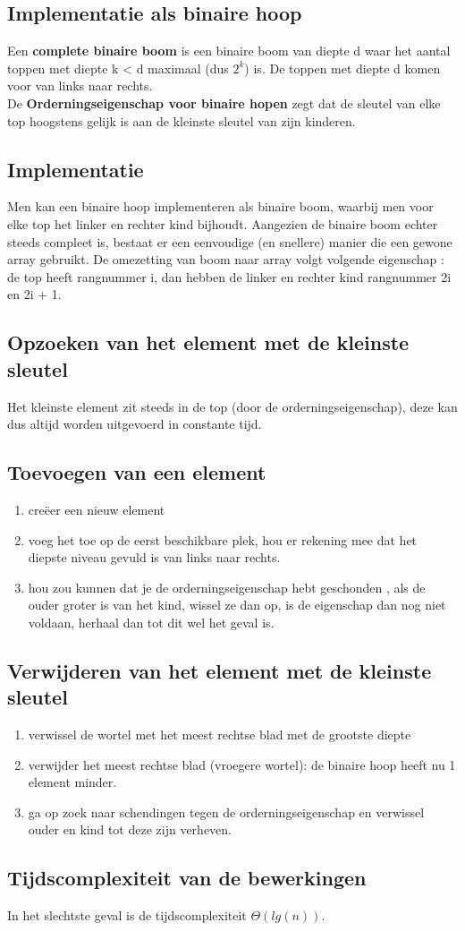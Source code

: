 \documentclass{report}
\begin{document}
  			\subsection{Implementatie als binaire hoop}
  				Een \textbf{complete binaire boom} is een binaire boom van diepte d waar het aantal toppen met diepte k < d maximaal (dus \(2^k\)) is. De toppen met diepte d komen voor van links naar rechts. 
  				\\ 
  				De \textbf{Orderningseigenschap voor binaire hopen} zegt dat de sleutel van elke top hoogstens gelijk is aan de kleinste sleutel van zijn kinderen. 
  			\subsection{Implementatie}
  				Men kan een binaire hoop implementeren als binaire boom, waarbij men voor elke top het linker en rechter kind bijhoudt. Aangezien de binaire boom echter steeds compleet is, bestaat er een eenvoudige (en snellere) manier die een gewone array gebruikt. De omezetting van boom naar array volgt volgende eigenschap : de top heeft rangnummer i, dan hebben de linker en rechter kind rangnummer 2i en 2i + 1.
  			\subsection{Opzoeken van het element met de kleinste sleutel}
  				Het kleinste element zit steeds in de top (door de orderningseigenschap), deze kan dus altijd worden uitgevoerd in constante tijd.
  			\subsection{Toevoegen van een element}
  				\begin{enumerate}
  					\item creëer een nieuw element
  					\item voeg het toe op de eerst beschikbare plek, hou er rekening mee dat het diepste niveau gevuld is van links naar rechts.
  					\item  hou zou kunnen dat je de orderningseigenschap hebt geschonden , als de ouder groter is van het kind, wissel ze dan op, is de eigenschap dan nog niet voldaan, herhaal dan tot dit wel het geval is.
  				\end{enumerate}
  			\subsection{Verwijderen van het element met de kleinste sleutel}
  				\begin{enumerate}
  					\item verwissel de wortel met het meest rechtse blad met de grootste diepte
  					\item verwijder het meest rechtse blad (vroegere wortel): de binaire hoop heeft nu 1 element minder.
  					\item ga op zoek naar schendingen tegen de orderningseigenschap en verwissel ouder en kind tot deze zijn verheven. 
  				\end{enumerate}
  			\subsection{Tijdscomplexiteit van de bewerkingen}
  				In het slechtste geval is de tijdscomplexiteit \(\Theta(lg(n))\).
  				
\end{document}
